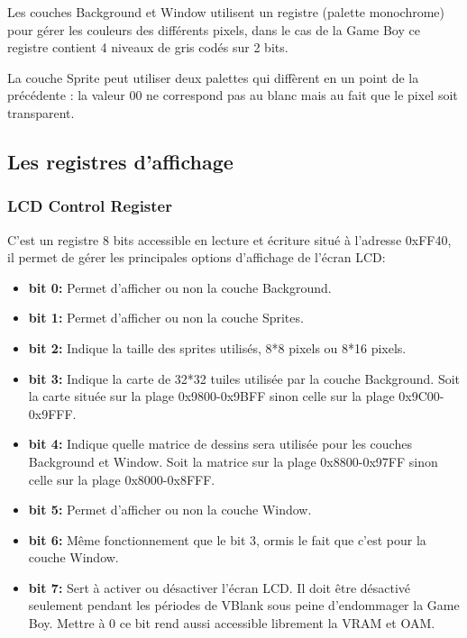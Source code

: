\documentclass[french]{report}
\begin{document}
Les couches Background et Window utilisent un registre (palette monochrome) pour gérer les
couleurs des différents pixels, dans le cas de la Game Boy ce registre contient
4 niveaux de gris codés sur 2 bits.

La couche Sprite peut utiliser deux palettes qui diffèrent en un point de la précédente : la valeur 00 ne correspond pas au blanc mais au fait que
le pixel soit transparent.\\

\subsection{Les registres d'affichage}
\subsubsection{LCD Control Register}
C'est un registre 8 bits accessible en lecture et écriture situé à l'adresse 0xFF40, il permet de gérer les principales options d'affichage de l'écran LCD:\\

\begin{itemize}
\item \textbf{bit 0:}
	Permet d'afficher ou non la couche Background.\\
\item \textbf{bit 1:}
	Permet d'afficher ou non la couche Sprites.\\
\item \textbf{bit 2:}
	Indique la taille des sprites utilisés, 8*8 pixels ou 8*16 pixels.\\
\item \textbf{bit 3:}
	Indique la carte de 32*32 tuiles utilisée par la couche Background. Soit la carte située sur la plage 0x9800-0x9BFF sinon celle sur la plage 0x9C00-0x9FFF.\\
\item \textbf{bit 4:}
	Indique quelle matrice de dessins sera utilisée pour les couches Background et Window. Soit la matrice sur la plage 0x8800-0x97FF sinon celle sur la plage 0x8000-0x8FFF.\\
\item \textbf{bit 5:}
	Permet d'afficher ou non la couche Window.\\
\item \textbf{bit 6:}
	Même fonctionnement que le bit 3, ormis le fait que c'est pour la couche Window.\\
\item \textbf{bit 7:}
	Sert à activer ou désactiver l'écran LCD. Il doit être désactivé seulement pendant les périodes de VBlank sous peine d'endommager la Game Boy. Mettre à 0 ce bit rend aussi accessible librement la VRAM et OAM.\\
\end{itemize}
\end{document}
